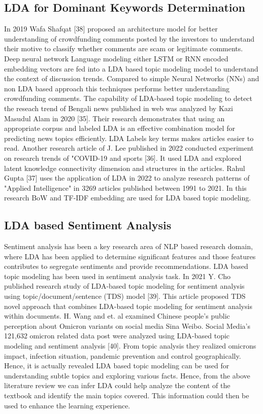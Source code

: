 \documentclass[sn-mathphys,Numbered]{sn-jnl}%
\theoremstyle{thmstyleone}%
\theoremstyle{thmstyletwo}%
\theoremstyle{thmstylethree}%
\begin{document}
\subsection{LDA for Dominant Keywords Determination}

In 2019 Wafa Shafqat {[}38{]} proposed an architecture model for better understanding of crowdfunding comments posted by the investors to understand their motive to classify whether comments are scam or legitimate comments. Deep neural network Language modeling either LSTM or RNN encoded embedding vectors are fed into a LDA based topic modeling model to understand the context of discussion trends. Compared to simple Neural Networks (NNs) and non LDA based approach this techniques performs better understanding crowdfunding comments. The capability of LDA-based topic modeling to detect the reseach trend of Bengali news published in web was analyzed by Kazi Masudul Alam in 2020 {[}35{]}. Their research demonstrates that using an appropriate corpus and labeled LDA is an effective combination model for predicting news topics efficiently. LDA Labels key terms makes articles easier to read. Another research article of J. Lee published in 2022 conducted experiment on research trends of "COVID-19 and sports {[}36{]}. It used LDA and explored latent knowledge connectivity dimension and structures in the articles. Rahul Gupta {[}37{]} uses the application of LDA in 2022 to analyze research patterns of "Applied Intelligence" in 3269 articles published between 1991 to 2021. In this research BoW and TF-IDF embedding are used for LDA based topic modeling.

\subsection{LDA based Sentiment Analysis}

Sentiment analysis has been a key research area of NLP based research domain, where LDA has been applied to determine significant features and those features contributes to segregate sentiments and provide recommendations. LDA based topic modeling has been used in sentiment analysis task. In 2021 Y. Cho published research study of LDA-based topic modeling for sentiment analysis using topic/document/sentence (TDS) model {[}39{]}. This article proposed TDS novel approach that combines LDA-based topic modeling for sentiment analysis within documents. H. Wang and et. al examined Chinese people's public perception about Omicron variants on social media Sina Weibo. Social Media's 121,632 omicron related data post were analyzed using LDA-based topic modeling and sentiment analysis {[}40{]}. From topic analysis they realized omicron\textquotesingle s impact, infection situation, pandemic prevention and control geographically. Hence, it is actually revealed LDA based topic modeling can be used for understanding subtle topics and exploring various facts. Hence, from the above literature review we can infer LDA could help analyze the content of the textbook and identify the main topics covered. This information could then be used to enhance the learning experience.
\end{document}

